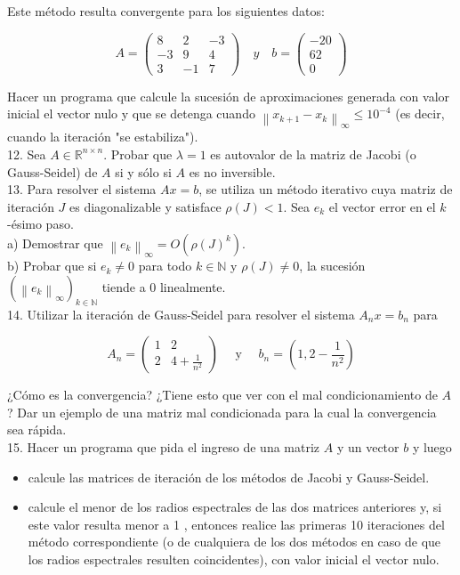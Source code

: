 \documentclass[10pt]{article}
\begin{document}
Este método resulta convergente para los siguientes datos:

$$
A=\left(\begin{array}{ccc}
8 & 2 & -3 \\
-3 & 9 & 4 \\
3 & -1 & 7
\end{array}\right) \quad y \quad b=\left(\begin{array}{c}
-20 \\
62 \\
0
\end{array}\right)
$$

Hacer un programa que calcule la sucesión de aproximaciones generada con valor inicial el vector nulo y que se detenga cuando $\left\|x_{k+1}-x_{k}\right\|_{\infty} \leq 10^{-4}$ (es decir, cuando la iteración "se estabiliza").\\
12. Sea $A \in \mathbb{R}^{n \times n}$. Probar que $\lambda=1$ es autovalor de la matriz de Jacobi (o Gauss-Seidel) de $A$ si y sólo si $A$ es no inversible.\\
13. Para resolver el sistema $A x=b$, se utiliza un método iterativo cuya matriz de iteración $J$ es diagonalizable y satisface $\rho(J)<1$. Sea $e_{k}$ el vector error en el $k$-ésimo paso.\\
a) Demostrar que $\left\|e_{k}\right\|_{\infty}=O\left(\rho(J)^{k}\right)$.\\
b) Probar que si $e_{k} \neq 0$ para todo $k \in \mathbb{N}$ y $\rho(J) \neq 0$, la sucesión $\left(\left\|e_{k}\right\|_{\infty}\right)_{k \in \mathbb{N}}$ tiende a 0 linealmente.\\
14. Utilizar la iteración de Gauss-Seidel para resolver el sistema $A_{n} x=b_{n}$ para

$$
A_{n}=\left(\begin{array}{cc}
1 & 2 \\
2 & 4+\frac{1}{n^{2}}
\end{array}\right) \quad \text { y } \quad b_{n}=\left(1,2-\frac{1}{n^{2}}\right)
$$

¿Cómo es la convergencia? ¿Tiene esto que ver con el mal condicionamiento de $A$ ? Dar un ejemplo de una matriz mal condicionada para la cual la convergencia sea rápida.\\
15. Hacer un programa que pida el ingreso de una matriz $A$ y un vector $b$ y luego

\begin{itemize}
  \item calcule las matrices de iteración de los métodos de Jacobi y Gauss-Seidel.
  \item calcule el menor de los radios espectrales de las dos matrices anteriores y, si este valor resulta menor a 1 , entonces realice las primeras 10 iteraciones del método correspondiente (o de cualquiera de los dos métodos en caso de que los radios espectrales resulten coincidentes), con valor inicial el vector nulo.
\end{itemize}
\end{document}
